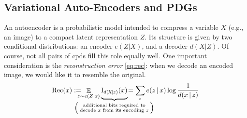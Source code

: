 \documentclass[twoside]{article}
\makeatletter
\theoremstyle{plain}
\theoremstyle{definition}
\DeclareMathOperator*{\Ex}{\mathbb{E}} %
\newcommand\aar{\@ifstar\aar@one@star\aar@plain}
\newcommand\aar@one@star{\@ifstar\aar@resize{\aar@plain*}}
\newcommand\aar@resize[1]{\sbox{\aar@content}{#1}\scaleleftright[3.8ex]
			{\Biggl\langle\!\!\!\!\Biggl\langle}{\usebox{\aar@content}}
			{\Biggr\rangle\!\!\!\!\Biggr\rangle}}
\makeatother
\begin{document}
\subsection{Variational Auto-Encoders and PDGs}

An autoencoder is a probabilistic model intended to compress a
variable $X$ (e.g., an image) to a compact latent representation
$Z$.
Its structure is given by two conditional distributions:
an encoder $e(Z | X)$, and a decoder $d(X | Z)$.
Of course, not all pairs of cpds fill this role equally well.
One important consideration is the
\emph{reconstruction error} \eqref{eq:rec}: when we decode an encoded image, we would like it to resemble the original.
\vspace{-0.5em}
\begin{equation}
	\mathrm{Rec}(x) := \!\!\!\!\! \Ex_{z \sim e(Z|x)} \smash{\underbrace{\mathrm I_{d(\!X\!|z)}(x)\vphantom{\Big|}}_{\mathclap{\left(\;\substack{\text{additional bits required to}\\\text{decode $x$ from its encoding  $z$}}\;\right)}}}
	\!= \sum_z e(z \,|\, x) \log \frac1{d(x \,|\, z)}\label{eq:rec}
\end{equation}
\vspace{0.0ex}
%
\end{document}
